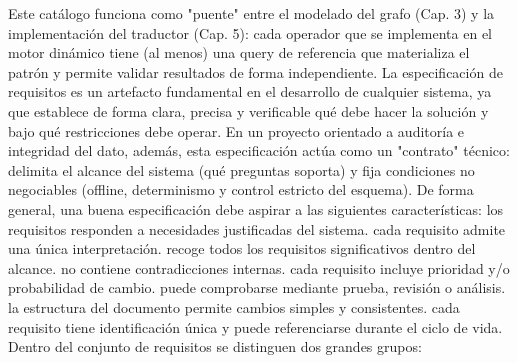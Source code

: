 {}Este catálogo funciona como "puente" entre el modelado del grafo (Cap. 3) y la implementación del traductor (Cap. 5): cada operador que se implementa en el motor dinámico tiene (al menos) una query de referencia que materializa el patrón y permite validar resultados de forma independiente.\markdownRendererInterblockSeparator
{}\markdownRendererInterblockSeparator
{}La especificación de requisitos es un artefacto fundamental en el desarrollo de cualquier sistema, ya que establece de forma clara, precisa y verificable qué debe hacer la solución y bajo qué restricciones debe operar. En un proyecto orientado a auditoría e integridad del dato, además, esta especificación actúa como un "contrato" técnico: delimita el alcance del sistema (qué preguntas soporta) y fija condiciones no negociables (offline, determinismo y control estricto del esquema).\markdownRendererInterblockSeparator
{}De forma general, una buena especificación debe aspirar a las siguientes características:\markdownRendererInterblockSeparator
{}\markdownRendererUlBeginTight
\markdownRendererUlItem {} los requisitos responden a necesidades justificadas del sistema.\markdownRendererUlItemEnd 
\markdownRendererUlItem {} cada requisito admite una única interpretación.\markdownRendererUlItemEnd 
\markdownRendererUlItem {} recoge todos los requisitos significativos dentro del alcance.\markdownRendererUlItemEnd 
\markdownRendererUlItem {} no contiene contradicciones internas.\markdownRendererUlItemEnd 
\markdownRendererUlItem {} cada requisito incluye prioridad y/o probabilidad de cambio.\markdownRendererUlItemEnd 
\markdownRendererUlItem {} puede comprobarse mediante prueba, revisión o análisis.\markdownRendererUlItemEnd 
\markdownRendererUlItem {} la estructura del documento permite cambios simples y consistentes.\markdownRendererUlItemEnd 
\markdownRendererUlItem {} cada requisito tiene identificación única y puede referenciarse durante el ciclo de vida.\markdownRendererUlItemEnd 
\markdownRendererUlEndTight \markdownRendererInterblockSeparator
{}Dentro del conjunto de requisitos se distinguen dos grandes grupos:\markdownRendererInterblockSeparator
{}\markdownRendererUlBeginTight
